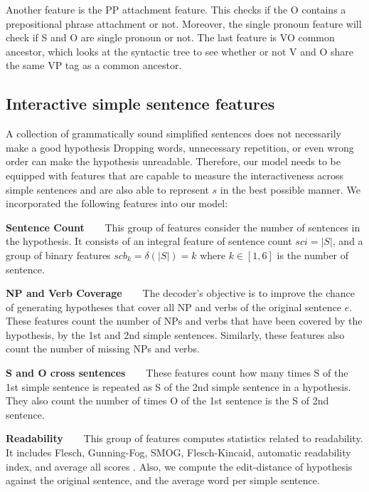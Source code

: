 \documentclass[10pt]{article}
\begin{document}
Another feature is the PP attachment feature.
This checks if the O contains a prepositional phrase attachment or not.
Moreover, the single pronoun feature will check if S and O are single pronoun or not.
The last feature is VO common ancestor, which looks at the syntactic tree to see whether or not V and O share the same VP tag as a common ancestor. 

\subsection{Interactive simple sentence features}

A collection of grammatically sound simplified sentences does not necessarily make a good hypothesis
Dropping words, unnecessary repetition, or even wrong order can make the hypothesis unreadable. 
Therefore, our model needs to be equipped with features that are capable to measure the interactiveness across simple sentences and are also able to represent $s$ in the best possible manner.
We incorporated the following features into our model:

\textbf{Sentence Count\ \ \ } This group of features consider the number of sentences in the hypothesis. It consists of an integral feature of sentence count $sci = |S|$, and a group of binary features $scb_k = \delta(|S|)=k$ where $k \in [1,6] $ is the number of sentence.

\textbf{NP and Verb Coverage\ \ \ } The decoder's objective is to improve the chance of generating hypotheses that cover all NP and verbs of the original sentence $e$.
These features count the number of NPs and verbs that have been covered by the hypothesis, by the 1st and 2nd simple sentences.
Similarly, these features also count the number of missing NPs and verbs.

\textbf{S and O cross sentences\ \ \ } These features count how many times S of the 1st simple sentence is repeated as S of the 2nd simple sentence in a hypothesis.
They also count the number of times O of the 1st sentence is the S of 2nd sentence.

\textbf{Readability\ \ \ } This group of features computes statistics related to readability.
It includes Flesch, Gunning-Fog, SMOG, Flesch-Kincaid, automatic readability index, and average all scores \cite{Flesch:1948,Gunning:1968,SMOG:1969,kincaid:1975}.
Also, we compute the edit-distance of hypothesis against the original sentence, and the average word per simple sentence.
\end{document}
